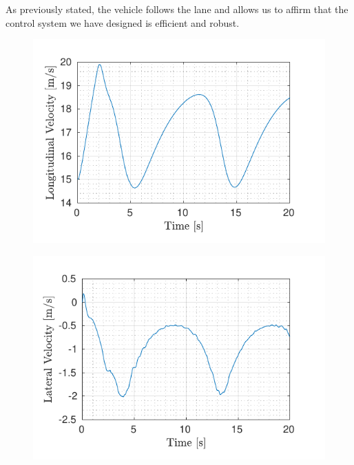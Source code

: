 As previously stated, the vehicle follows the lane and allows us to affirm that the control system we have designed is efficient and robust.
\begin{figure}[!h]
	\begin{minipage}[t]{0.5\textwidth}
		\includegraphics[width=\textwidth]{../../MATLAB/lane_following_circular_path/figure/LongitudinalVelocityVsTime_circular.pdf}
		\label{fig:longitudinal_velocity_laneFollowing_circular}
	\end{minipage}
	\begin{minipage}[t]{0.5\textwidth}
		\includegraphics[width=\textwidth]{../../MATLAB/lane_following_circular_path/figure/LateralVelocityVsTime_circular.pdf}

\end{minipage}
\end{figure}
